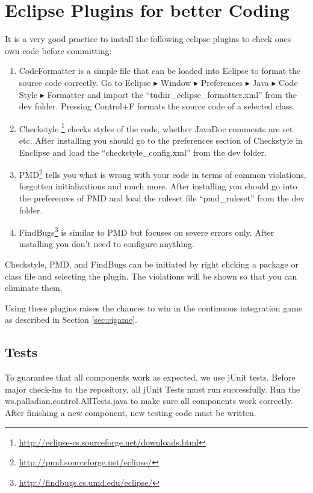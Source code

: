 \documentclass[a4paper,twoside]{book}      %
\begin{document}
\section{Eclipse Plugins for better Coding}
\label{sec:eclipseCodingPlugins}
It is a very good practice to install the following eclipse plugins to check ones own code before committing:
\begin{enumerate}
\item CodeFormatter is a simple file that can be loaded into Eclipse to format the source code correctly. Go to Eclipse $\blacktriangleright$ Window $\blacktriangleright$ Preferences $\blacktriangleright$ Java $\blacktriangleright$ Code Style $\blacktriangleright$ Formatter and import the ``tudiir\_eclipse\_formatter.xml'' from the dev folder. Pressing Control+F formats the source code of a selected class.
\item Checkstyle \footnote{\url{http://eclipse-cs.sourceforge.net/downloads.html}} checks styles of the code, whether JavaDoc comments are set etc. After installing you should go to the preferences section of Checkstyle in Enclipse and load the ``checkstyle\_config.xml'' from the dev folder.
\item PMD\footnote{\url{http://pmd.sourceforge.net/eclipse/}} tells you what is wrong with your code in terms of common violations, forgotten initializations and much more. After installing you should go into the preferences of PMD and load the ruleset file ``pmd\_ruleset'' from the dev folder.
\item FindBugs\footnote{\url{http://findbugs.cs.umd.edu/eclipse/}} is similar to PMD but focuses on severe errors only. After installing you don't need to configure anything.
\end{enumerate}

Checkstyle, PMD, and FindBugs can be initiated by right clicking a package or class file and selecting the plugin. The violations will be shown so that you can eliminate them.

Using these plugins raises the chances to win in the continuous integration game as described in Section \ref{sec:cigame}.

\subsection{Tests}
To guarantee that all components work as expected, we use jUnit tests. Before major check-ins to the repository, all jUnit Tests must run successfully. Run the ws.palladian.control.AllTests.java to make sure all components work correctly.
After finishing a new component, new testing code must be written.
\end{document}
